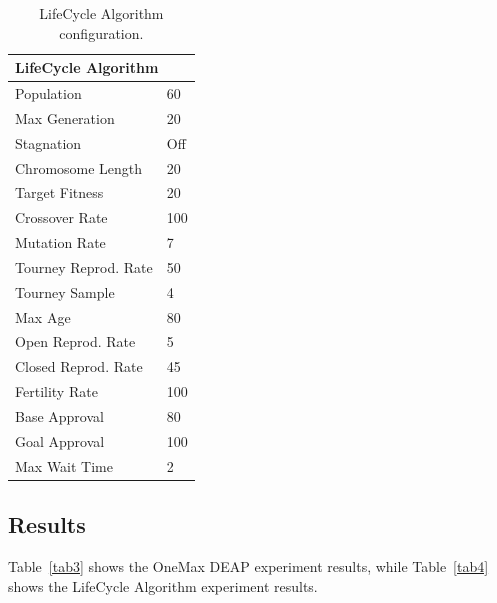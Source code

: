 \documentclass[runningheads]{llncs}
\begin{document}
    \begin{table}[]
        \centering        
        \caption{LifeCycle Algorithm configuration.}\label{tab2}
        \begin{tabular}{|l|l|}
        \hline
        \multicolumn{2}{|l|}{LifeCycle   Algorithm} \\ \hline
        Population & 60 \\ \hline
        Max   Generation & 20 \\ \hline
        Stagnation & Off \\ \hline
        Chromosome   Length & 20 \\ \hline
        Target   Fitness & 20 \\ \hline
        Crossover   Rate & 100 \\ \hline
        Mutation   Rate & 7 \\ \hline
        Tourney   Reprod. Rate & 50 \\ \hline
        Tourney   Sample & 4 \\ \hline
        Max   Age & 80 \\ \hline
        Open   Reprod. Rate & 5 \\ \hline
        Closed   Reprod. Rate & 45 \\ \hline
        Fertility   Rate & 100 \\ \hline
        Base   Approval & 80 \\ \hline
        Goal   Approval & 100 \\ \hline
        Max   Wait Time & 2 \\ \hline
        \end{tabular}
        \end{table}

\subsection{Results}
    Table~\ref{tab3} shows the OneMax DEAP experiment results, while Table~\ref{tab4} shows the LifeCycle Algorithm experiment results.
\end{document}
